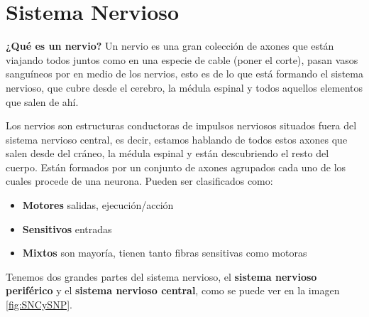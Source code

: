 \section{Sistema Nervioso}


\textbf{¿Qué es un nervio?}
Un nervio es una gran colección de axones que están viajando todos juntos como en una especie de cable (poner el corte), pasan vasos sanguíneos por en medio de los nervios, esto es de lo que está formando el sistema nervioso, que cubre desde el cerebro, la médula espinal y todos aquellos elementos que salen de ahí.

Los nervios son estructuras conductoras de impulsos nerviosos situados fuera del sistema nervioso central, es decir, estamos hablando de todos estos axones que salen desde del cráneo, la médula espinal y están descubriendo el resto del cuerpo.
Están formados por un conjunto de axones agrupados cada uno de los cuales procede de una neurona. Pueden ser clasificados como:

\begin{itemize}
\item \textbf{Motores} salidas, ejecución/acción  
\item \textbf{Sensitivos} entradas 
\item \textbf{Mixtos} son mayoría, tienen tanto fibras sensitivas como motoras
\end{itemize}


Tenemos dos grandes partes del sistema nervioso, el \textbf{sistema nervioso periférico} y el \textbf{sistema nervioso central}, como se puede ver en la imagen \ref{fig:SNCySNP}. 

